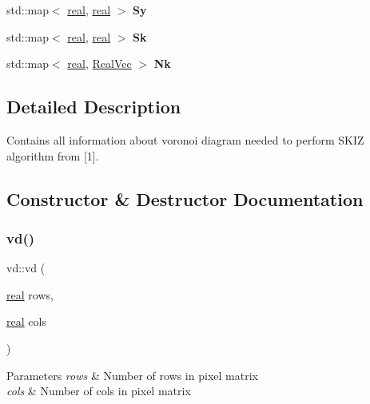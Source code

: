 \begin{DoxyCompactItemize}
\item 
\mbox{\label{classvd_abfa4f5d8305394eed7e36fabbb65e782}} 
std\+::map$<$ \mbox{\hyperlink{typedefs_8cpp_a58a0c7cf2501f4492da833421be92547}{real}}, \mbox{\hyperlink{typedefs_8cpp_a58a0c7cf2501f4492da833421be92547}{real}} $>$ {\bfseries Sy}
\item 
\mbox{\label{classvd_a8b0e7202fac9d8411a0b3d1e6960bf5e}} 
std\+::map$<$ \mbox{\hyperlink{typedefs_8cpp_a58a0c7cf2501f4492da833421be92547}{real}}, \mbox{\hyperlink{typedefs_8cpp_a58a0c7cf2501f4492da833421be92547}{real}} $>$ {\bfseries Sk}
\item 
\mbox{\label{classvd_a417f0bd0c1c54c7d927352df356134b6}} 
std\+::map$<$ \mbox{\hyperlink{typedefs_8cpp_a58a0c7cf2501f4492da833421be92547}{real}}, \mbox{\hyperlink{typedefs_8cpp_a84b6d9a0fbb45e01ad4a3aa5667f2992}{Real\+Vec}} $>$ {\bfseries Nk}
\end{DoxyCompactItemize}


\subsection{Detailed Description}
Contains all information about voronoi diagram needed to perform S\+K\+IZ algorithm from \mbox{[}1\mbox{]}. 

\subsection{Constructor \& Destructor Documentation}
\mbox{\label{classvd_a765c16ee377a2a0f9651d555edd3a158}} 
\subsubsection{\texorpdfstring{vd()}{vd()}}
{\footnotesize\ttfamily vd\+::vd (\begin{DoxyParamCaption}\item[{\mbox{\hyperlink{typedefs_8cpp_a58a0c7cf2501f4492da833421be92547}{real}}}]{rows,  }\item[{\mbox{\hyperlink{typedefs_8cpp_a58a0c7cf2501f4492da833421be92547}{real}}}]{cols }\end{DoxyParamCaption})}


\begin{DoxyParams}{Parameters}
{\em rows} & Number of rows in pixel matrix \\
\hline
{\em cols} & Number of cols in pixel matrix \\
\hline
\end{DoxyParams}


